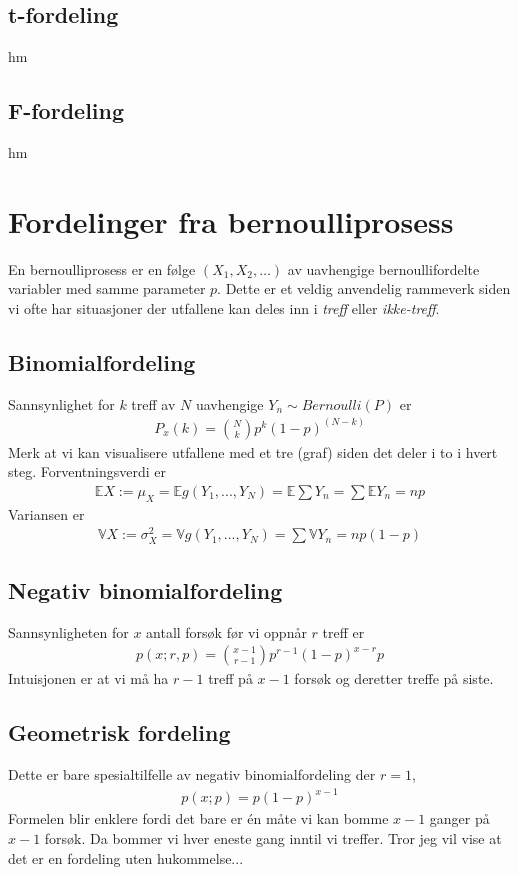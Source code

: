 \subsection{t-fordeling}
hm
\subsection{F-fordeling}
hm
\section{Fordelinger fra bernoulliprosess}
En bernoulliprosess er en følge $(X_1, X_2, \ldots)$ av uavhengige bernoullifordelte variabler med samme parameter $p$. Dette er et veldig anvendelig rammeverk siden vi ofte har situasjoner der utfallene kan deles inn i \textit{treff} eller \textit{ikke-treff}. 
\subsection{Binomialfordeling}
Sannsynlighet for $k$ treff av $N$ uavhengige $Y_n \sim Bernoulli(P)$ er 
\begin{align}
P_x(k) = \binom{N}{k} p^k(1-p)^{(N-k)}
\end{align}
Merk at vi kan visualisere utfallene med et tre (graf) siden det deler i to i hvert steg. Forventningsverdi er
\begin{align}
\mathbb{E}X := \mu_X= \mathbb{E}g(Y_1,...,Y_N) = \mathbb{E}\sum Y_n = \sum \mathbb{E}Y_n = np
\end{align}
Variansen er 
\begin{align}
\mathbb{V}X := \sigma_X^2 = \mathbb{V}g(Y_1,...,Y_N) = \sum \mathbb{V}Y_n = np(1-p)
\end{align}
\subsection{Negativ binomialfordeling}
Sannsynligheten for $x$ antall forsøk før vi oppnår $r$ treff er
\begin{align}
p(x;r,p)=\binom{x-1}{r-1}p^{r-1}(1-p)^{x-r}p
\end{align}
Intuisjonen er at vi må ha $r-1$ treff på $x-1$ forsøk og deretter treffe på siste. 
\subsection{Geometrisk fordeling}
Dette er bare spesialtilfelle av negativ binomialfordeling der $r=1$,
\begin{align}
p(x;p) = p(1-p)^{x-1}
\end{align}
Formelen blir enklere fordi det bare er én måte vi kan bomme $x-1$ ganger på $x-1$ forsøk. Da bommer vi hver eneste gang inntil vi treffer. Tror jeg vil vise at det er en fordeling uten hukommelse...
